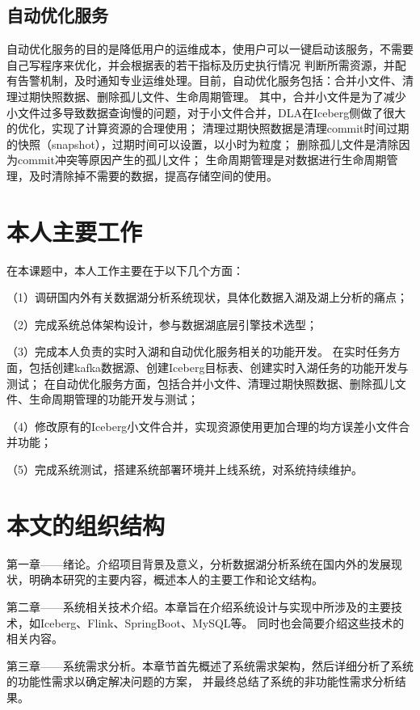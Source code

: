 \subsection{自动优化服务}

自动优化服务的目的是降低用户的运维成本，使用户可以一键启动该服务，不需要自己写程序来优化，并会根据表的若干指标及历史执行情况
判断所需资源，并配有告警机制，及时通知专业运维处理。目前，自动优化服务包括：合并小文件、清理过期快照数据、删除孤儿文件、生命周期管理。
其中，合并小文件是为了减少小文件过多导致数据查询慢的问题，对于小文件合并，DLA在Iceberg侧做了很大的优化，实现了计算资源的合理使用；
清理过期快照数据是清理commit时间过期的快照（snapshot），过期时间可以设置，以小时为粒度；
删除孤儿文件是清除因为commit冲突等原因产生的孤儿文件；
生命周期管理是对数据进行生命周期管理，及时清除掉不需要的数据，提高存储空间的使用。

\section{本人主要工作}

在本课题中，本人工作主要在于以下几个方面：

（1）调研国内外有关数据湖分析系统现状，具体化数据入湖及湖上分析的痛点；

（2）完成系统总体架构设计，参与数据湖底层引擎技术选型；

（3）完成本人负责的实时入湖和自动优化服务相关的功能开发。
在实时任务方面，包括创建kafka数据源、创建Iceberg目标表、创建实时入湖任务的功能开发与测试；
在自动优化服务方面，包括合并小文件、清理过期快照数据、删除孤儿文件、生命周期管理的功能开发与测试；

（4）修改原有的Iceberg小文件合并，实现资源使用更加合理的均方误差小文件合并功能；

（5）完成系统测试，搭建系统部署环境并上线系统，对系统持续维护。

\section{本文的组织结构}

第一章——绪论。介绍项目背景及意义，分析数据湖分析系统在国内外的发展现状，明确本研究的主要内容，概述本人的主要工作和论文结构。

第二章——系统相关技术介绍。本章旨在介绍系统设计与实现中所涉及的主要技术，如Iceberg、Flink、SpringBoot、MySQL等。
同时也会简要介绍这些技术的相关内容。

第三章——系统需求分析。本章节首先概述了系统需求架构，然后详细分析了系统的功能性需求以确定解决问题的方案，
并最终总结了系统的非功能性需求分析结果。

